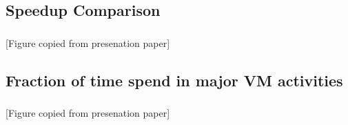 \documentclass[mathserif,10pt]{beamer}
\begin{document}
\subsection{Speedup Comparison}
\frame
{
  \frametitle{\subsecname}
  \begin{figure}[h]
  \centering
  \end{figure}
  [Figure copied from presenation paper]
}
\subsection{Fraction of time spend in major VM activities}
\frame
{
  \frametitle{\subsecname}
  \begin{figure}[h]
  \centering
  \end{figure}
  [Figure copied from presenation paper]
}
\end{document}
